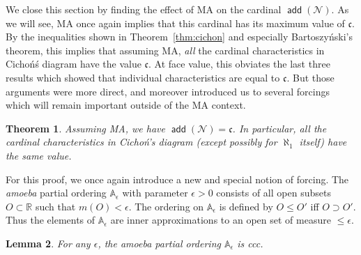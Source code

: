 \documentclass[11pt,oneside]{amsbook}
\newcommand{\R}{\mathbb R}
\newcommand{\Null}{\mathcal N}
\DeclareMathOperator{\add}{\mathsf{add}}
\theoremstyle{definition}
\theoremstyle{plain}
\newtheorem{theorem}{Theorem}[section]
\newtheorem{lemma}[theorem]{Lemma}
\theoremstyle{definition}
\theoremstyle{remark}
\numberwithin{equation}{section}
\numberwithin{figure}{section}
\begin{document}
We close this section by finding the effect of MA on the cardinal $\add(\Null)$. As we will see, MA once again implies that this cardinal has its maximum value of $\mathfrak c$. By the inequalities shown in Theorem~\ref{thm:cichon} and especially Bartoszy\'nski's theorem, this implies that assuming MA, \emph{all} the cardinal characteristics in Cicho\'n\'s diagram have the value $\mathfrak c$. At face value, this obviates the last three results which showed that individual characteristics are equal to $\mathfrak c$. But those arguments were more direct, and moreover introduced us to several forcings which will remain important outside of the MA context.

\begin{theorem}
  \label{thm:ma-addn}
  Assuming MA, we have $\add(\Null)=\mathfrak c$. In particular, all the cardinal characteristics in Cicho\'n's diagram (except possibly for $\aleph_1$ itself) have the same value.
\end{theorem}

For this proof, we once again introduce a new and special notion of forcing. The \emph{amoeba} partial ordering $\mathbb A_\epsilon$ with parameter $\epsilon>0$ consists of all open subsets $O\subset\R$ such that $m(O)<\epsilon$. The ordering on $\mathbb A_\epsilon$ is defined by $O\leq O'$ iff $O\supset O'$. Thus the elements of $\mathbb A_\epsilon$ are inner approximations to an open set of measure $\leq\epsilon$.

\begin{lemma}
  For any $\epsilon$, the amoeba partial ordering $\mathbb A_\epsilon$ is ccc.
\end{lemma}
\end{document}
